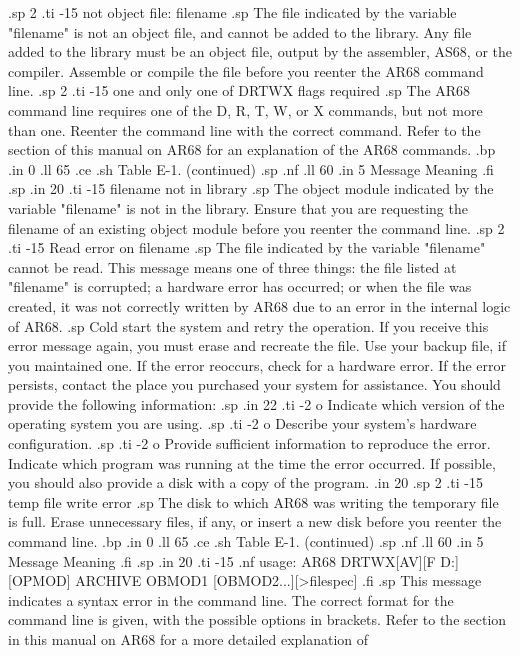 .sp 2
.ti -15
not object file:  filename
.sp
The file indicated by the variable "filename" is not an object file,
and cannot be added to the library.  Any file added to the library must be an 
object file, output by the 
assembler, AS68, or the compiler.  Assemble or compile the file before 
you reenter the AR68 command line.
.sp 2
.ti -15
one and only one of DRTWX flags required
.sp
The AR68 command line requires one of the D, R, T, W, or 
X commands, but not more than one.  Reenter the command line with the correct 
command.  Refer to the section of this manual on AR68 for an explanation 
of the AR68 commands.
.bp
.in 0
.ll 65
.ce
.sh
Table E-1.  (continued)
.sp
.nf
.ll 60
.in 5
Message        Meaning
.fi
.sp
.in 20
.ti -15
filename not in library 
.sp
The object module indicated by the variable "filename" is not in 
the library.  Ensure that you are requesting the filename of an 
existing object module before you reenter the command line. 
.sp 2
.ti -15
Read error on filename
.sp
The file indicated by the variable 
"filename" cannot be read.  This message means one of three things:  the file 
listed at "filename" is corrupted; a hardware error has occurred; or when the 
file was created, it was not 
correctly written by AR68 due to an 
error in the internal logic of AR68.  
.sp
Cold start the system and retry the operation.  If you receive this error 
message again, you must erase and recreate the file.  Use your backup file, 
if you maintained one.  If the error reoccurs, check for a hardware error.  
If the error persists, contact the place you purchased your system for 
assistance.  You should provide the following information:
.sp
.in 22
.ti -2
o Indicate which version of the operating system you are using.
.sp
.ti -2
o Describe your system's hardware configuration.
.sp
.ti -2
o Provide sufficient information to reproduce the error.  Indicate 
which program was running at the time the error occurred.  If possible, 
you should also provide a disk with a copy of the program.
.in 20
.sp 2
.ti -15
temp file write error
.sp
The disk to which AR68 was writing the temporary file is full.  Erase 
unnecessary files, if any, or insert a new disk before 
you reenter the command line.
.bp
.in 0
.ll 65
.ce
.sh
Table E-1.  (continued)
.sp
.nf
.ll 60
.in 5
Message        Meaning
.fi
.sp
.in 20
.ti -15
.nf
usage: AR68 DRTWX[AV][F D:] [OPMOD] ARCHIVE OBMOD1 [OBMOD2...][>filespec]
.fi
.sp
This message indicates a syntax error in the command line.  The correct 
format for
the command line is given, with the possible options in brackets.  Refer
to the section in this manual on AR68 for a more detailed explanation of 
